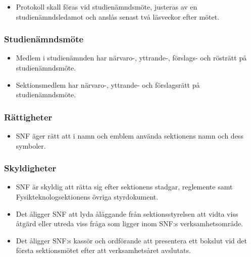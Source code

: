 \documentclass[11pt,a4paper]{article}
\begin{document}
\begin{itemize}

  \item Protokoll skall föras vid studienämndsmöte, justeras av en
  studie\-nämnds\-leda\-mot och anslås senast två läsveckor efter mötet.

\end{itemize}

\subsubsection{Studienämndsmöte}

\begin{itemize}

  \item Medlem i studienämnden har
  närvaro-, yttrande-, förslags- och rösträtt på studienämndsmöte. 
  
  \item Sektionsmedlem har närvaro-, yttr\-ande- och förslagsrätt på studienämndsmöte.

\end{itemize}

\subsubsection{Rättigheter}

\begin{itemize}

  \item SNF äger rätt att i namn och emblem använda sektionens namn
  och dess symboler.

\end{itemize}

\subsubsection{Skyldigheter}

\begin{itemize}

  \item SNF är skyldig att rätta sig efter sektionens stadgar,
  reglemente samt Fysikteknologsektionens övriga styrdokument.

  \item Det åligger SNF att lyda åläggande från sektionsstyrelsen att
  vidta viss åtgärd eller utreda viss fråga som ligger inom SNF:s
  verksamhetsområde.
  
  \item Det åligger SNF:s kassör och ordförande att presentera ett bokslut vid det första sektionsmötet efter att verksamhetsåret avslutats.

\end{itemize}
\end{document}
